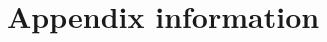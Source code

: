 \documentclass[twocolumn]{aastex631}
\begin{document}
\begin{acknowledgments}

\end{acknowledgments}

%

\vspace{5mm}
\facilities{}


\software{}



\appendix

\section{Appendix information}
\end{document}
